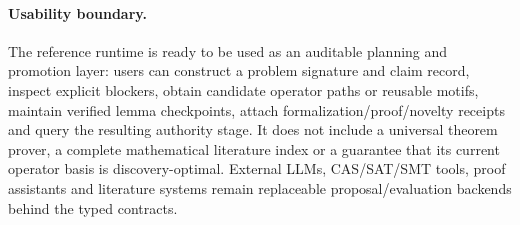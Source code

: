 \paragraph{Usability boundary.}
The reference runtime is ready to be used as an auditable planning and promotion layer: users can construct a problem signature and claim record, inspect explicit blockers, obtain candidate operator paths or reusable motifs, maintain verified lemma checkpoints, attach formalization/proof/novelty receipts and query the resulting authority stage. It does not include a universal theorem prover, a complete mathematical literature index or a guarantee that its current operator basis is discovery-optimal. External LLMs, CAS/SAT/SMT tools, proof assistants and literature systems remain replaceable proposal/evaluation backends behind the typed contracts.
